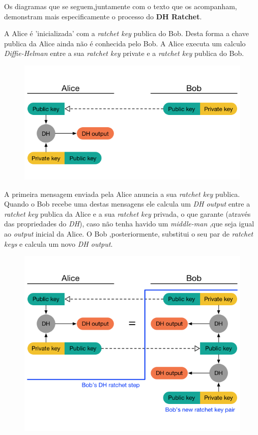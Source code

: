 Os diagramas que se seguem,juntamente com o texto que os acompanham, demonstram mais especificamente o processo do \textbf{DH Ratchet}.


A Alice é 'inicializada' com a \textit{ratchet key} publica do Bob. Desta forma a chave publica da Alice ainda não é conhecida pelo Bob. A Alice executa um calculo \textit{Diffie-Helman} entre a sua \textit{ratchet key} private e a \textit{ratchet key} publica do Bob.

\begin{figure}[H]
\begin{center}
\includegraphics[width=12cm]{img/DH1.png}
\caption{}
\label{diagram:DH1}
\centering
\end{center}
\end{figure}

A primeira mensagem enviada pela Alice anuncia a sua \textit{ratchet key} publica. Quando o Bob recebe uma destas mensagens ele calcula um \textit{DH output} entre a \textit{ratchet key} publica da Alice e a sua \textit{ratchet key} privada, o que garante (através das propriedades do \textit{DH}), caso não tenha havido um \textit{middle-man} ,que seja igual ao \textit{output} inicial da Alice. O Bob ,posteriormente, substitui o seu par de \textit{ratchet keys} e calcula um novo \textit{DH output}.

\begin{figure}[H]
\begin{center}
\includegraphics[width=12cm]{img/DH2.png}
\caption{}
\label{diagram:DH2}
\centering
\end{center}
\end{figure}

